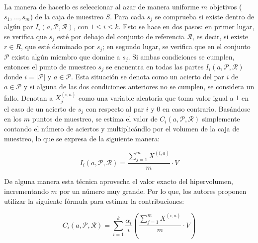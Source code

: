   La manera de hacerlo es seleccionar al azar de manera uniforme $m$ objetivos ($s_1, \ldots, s_m$) de la caja de muestreo $S$. 
  Para cada $s_j$ se comprueba si existe dentro de alg\'un par $I_i\left(a,\mathcal{P},\mathcal{R} \right)$, con
  $1 \leq i \leq k$. Esto se hace en dos pasos: en primer lugar, se verifica que $s_j$ est\'e por debajo del conjunto de 
  referencia $\mathcal{R}$, es decir, si existe $r \in R$, que est\'e dominado por $s_j$; en segundo lugar, se 
  verifica que en el conjunto $\mathcal{P}$ exista alg\'un miembro que domine a $s_j$. Si ambas condiciones se cumplen, 
  entonces el punto de muestreo $s_j$ se encuentra en todas las partes $I_i\left(a,\mathcal{P},\mathcal{R} \right)$
  donde $i=|\mathcal{P}|$ y $a \in \mathcal{P}$. Esta situaci\'on se denota como un acierto del par $i$ de $a \in \mathcal{P}$ y si 
  alguna de las dos condiciones anteriores no se cumplen, se considera un fallo. Denotan a $X^{\left(i, a\right)}_{j}$ como una variable 
  aleatoria que toma valor igual a $1$ en el caso de un acierto de  $s_j$ con respecto al par $i$ y $0$ en caso contrario. Bas\'andose 
  en los $m$ puntos de muestreo, se estima el valor de $C_i\left(a, \mathcal{P},\mathcal{R} \right)$ simplemente contando el 
  n\'umero de aciertos y multiplic\'andlo por el volumen de la caja de muestreo, lo que se expresa de la siguiente manera:
  
    \[I_i\left(a, \mathcal{P},\mathcal{R} \right) = \frac{\sum^{m}_{j=1}{X^{\left(i, a\right)}}}{m} \cdot V\]
    
  De alguna manera esta t\'ecnica aprovecha el valor exacto del hipervolumen, incrementando $m$ por un n\'umero muy grande. Por lo 
  que, los autores proponen utilizar la siguiente f\'ormula para estimar la contribuciones:
    
  \[C_i\left(a, \mathcal{P},\mathcal{R} \right) = \sum^{k}_{i=1}{\frac{\alpha_i}{i}}\left(\frac{\sum^{m}_{j=1}{X^{\left(i, a\right)}}}{m} \cdot V\right)\]
    
